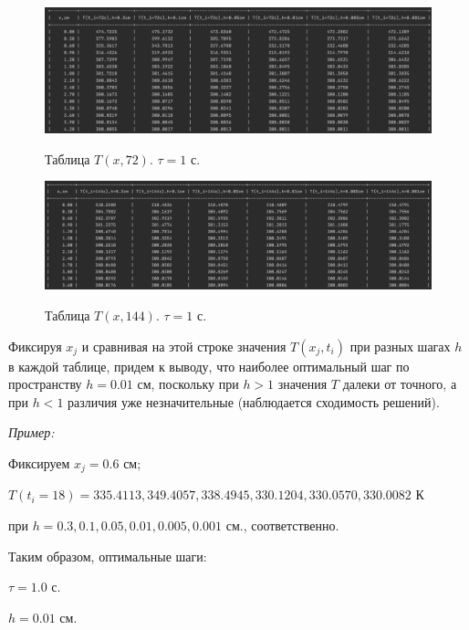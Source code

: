 \documentclass[a4paper,12pt]{article}
\begin{document}
	\newpage
	
	\begin{figure}[h!]
		\begin{center}
			{\includegraphics[scale = 0.45]{72_2.png}}
			\label{table:72_2}
		\end{center}
		\caption{Таблица $T(x, 72)$. $\tau = 1$ с.}
	\end{figure}
	
	\begin{figure}[h!]
		\begin{center}
			{\includegraphics[scale = 0.45]{144_2.png}}
			\label{table:144_2}
		\end{center}
		\caption{Таблица $T(x, 144)$. $\tau = 1$ с.}
	\end{figure}
	
	Фиксируя $x_j$ и сравнивая на этой строке значения $T(x_j, t_i)$ при разных шагах $h$ в каждой таблице, придем к выводу, что наиболее оптимальный шаг по пространству $h = 0.01$ см, поскольку при $h > 1$ значения $T$ далеки от точного, а при $h < 1$ различия уже незначительные (наблюдается сходимость решений).
	
	\textit{Пример: }
	
	Фиксируем $x_j = 0.6$ см; 
	
	$T(t_i = 18) = 335.4113, 349.4057, 338.4945, 330.1204, 330.0570, 330.0082$ К 
	
	при $h = 0.3, 0.1, 0.05, 0.01, 0.005, 0.001$ см., соответственно.
	
	Таким образом, оптимальные шаги:
	
	$\tau = 1.0$ с.
	
	$h = 0.01$ см.
	
	\newpage
	
\end{document}
